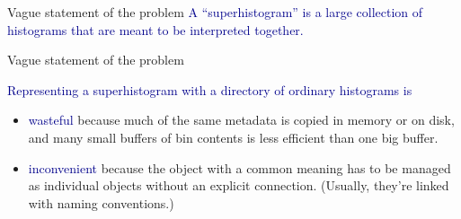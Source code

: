 \documentclass[aspectratio=169]{beamer}
\begin{document}
\begin{frame}{Vague statement of the problem}
\vspace{0.5 cm}
\Large
\textcolor{darkblue}{A ``superhistogram'' is a large collection of histograms that are meant to be interpreted together.}
\end{frame}

\begin{frame}{Vague statement of the problem}
\vspace{0.5 cm}
\large

\textcolor{darkblue}{Representing a superhistogram with a directory of ordinary histograms is}

\vspace{0.5 cm}
\begin{itemize}\setlength{\itemsep}{0.5 cm}
\item \textcolor{darkblue}{wasteful} because much of the same metadata is copied in memory or on disk, and many small buffers of bin contents is less efficient than one big buffer.

\item \textcolor{darkblue}{inconvenient} because the object with a common meaning has to be managed as individual objects without an explicit connection. (Usually, they're linked with naming conventions.)
\end{itemize}
\end{frame}
\end{document}
